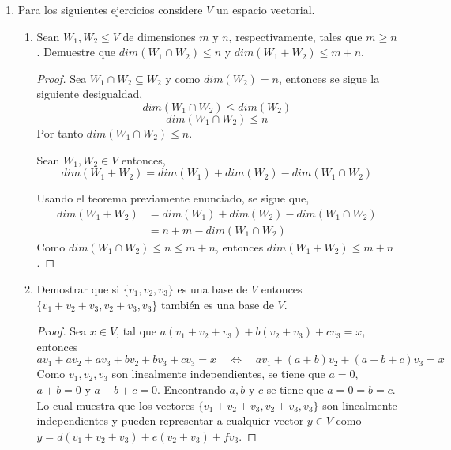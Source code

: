 \documentclass[11pt,letterpaper]{article}
\begin{document}
\begin{enumerate}

\item Para los siguientes ejercicios considere $V$ un espacio vectorial.

\begin{enumerate}[label=(\alph*)]
    \item Sean $W_1, W_2 \leqslant V$ de dimensiones $m$ y $n$, respectivamente, tales que $m \geq n$.
    Demuestre que $dim(W_1 \cap W_2) \leq n$ y $dim(W_1 + W_2) \leq m + n$.
    \begin{proof}
        Sea $W_1 \cap W_2 \subseteq W_2$ y como $dim(W_2) = n$, entonces se sigue la siguiente desigualdad,
        \[ dim(W_1 \cap W_2) \leq dim(W_2) \]
        \[ dim(W_1 \cap W_2) \leq n \]
        Por tanto $dim(W_1 \cap W_2) \leq n$.

        \begin{theorem}
            Sean $W_1, W_2 \in V$ entonces,
            \[ dim(W_1 + W_2) = dim(W_1) + dim(W_2) - dim(W_1 \cap W_2) \]
        \end{theorem}
        Usando el teorema previamente enunciado, se sigue que,
        \begin{align*}
            dim(W_1 + W_2)
                &= dim(W_1) + dim(W_2) - dim(W_1 \cap W_2)\\
                &= n + m - dim(W_1 \cap W_2)
        \end{align*}
        Como $dim(W_1 \cap W_2) \leq n \leq m + n$, entonces $dim(W_1 + W_2) \leq m + n$.
    \end{proof}

    \item Demostrar que si $\{ v_1, v_2, v_3 \}$ es una base de $V$ entonces
    $\{ v_1 + v_2 + v_3, v_2 + v_3, v_3 \}$ también es una base de $V$.
    \begin{proof}
        Sea $x \in V$, tal que $a(v_1 + v_2 + v_3) + b(v_2 + v_3) + cv_3 = x$, entonces
        \[ av_1 + av_2 + av_3 + bv_2 + bv_3 + cv_3 = x \quad \iff \quad
            av_1 + (a+b)v_2 + (a+b+c)v_3 = x \]
        Como $v_1, v_2, v_3$ son linealmente independientes, se tiene que $a=0$,
        $a+b = 0$ y $a+b+c = 0$. Encontrando $a,b$ y $c$ se tiene que $a=0=b=c$.
        Lo cual muestra que los vectores $\{ v_1 + v_2 + v_3, v_2 + v_3, v_3 \}$ son 
        linealmente independientes y pueden representar a cualquier vector $y \in V$ como
        $y = d(v_1 + v_2 + v_3) + e(v_2 + v_3) + fv_3$.
    \end{proof}
\end{enumerate}


\end{enumerate}
\end{document}
